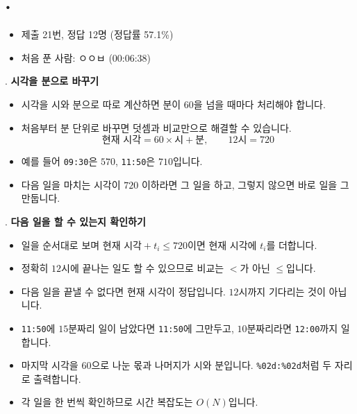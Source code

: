 
\section{\texorpdfstring{\pletter. \ptitle}{문제 \pletter}}

\begin{frame}[label=problem-C]
    \sectiontitle{\pletter}{\ptitle}
    \begin{itemize}
        \item 제출 21번, 정답 12명 (정답률 57.1\%)
        \item 처음 푼 사람: ㅇㅇㅂ (00:06:38)
    \end{itemize}
\end{frame}

\begin{frame}{\textbf{\pletter}. \ptitle}
    \textbf{시각을 분으로 바꾸기}
\begin{itemize}
        \item 시각을 시와 분으로 따로 계산하면 분이 $60$을 넘을 때마다 처리해야 합니다.
        \item 처음부터 분 단위로 바꾸면 덧셈과 비교만으로 해결할 수 있습니다.
        \[
            \text{현재 시각}=60\times\text{시}+\text{분},\qquad 12\text{시}=720
        \]
        \item 예를 들어 \texttt{09:30}은 $570$, \texttt{11:50}은 $710$입니다.
        \item 다음 일을 마치는 시각이 $720$ 이하라면 그 일을 하고, 그렇지 않으면 바로 일을 그만둡니다.
    \end{itemize}
\end{frame}

\begin{frame}{\textbf{\pletter}. \ptitle}
    \textbf{다음 일을 할 수 있는지 확인하기}
\begin{itemize}
        \item 일을 순서대로 보며 $\text{현재 시각}+t_i\le720$이면 현재 시각에 $t_i$를 더합니다.
        \item 정확히 $12$시에 끝나는 일도 할 수 있으므로 비교는 $<$가 아닌 $\le$입니다.
        \item 다음 일을 끝낼 수 없다면 현재 시각이 정답입니다. $12$시까지 기다리는 것이 아닙니다.
        \item \texttt{11:50}에 $15$분짜리 일이 남았다면 \texttt{11:50}에 그만두고, $10$분짜리라면 \texttt{12:00}까지 일합니다.
        \item 마지막 시각을 $60$으로 나눈 몫과 나머지가 시와 분입니다. \texttt{\%02d:\%02d}처럼 두 자리로 출력합니다.
        \item 각 일을 한 번씩 확인하므로 시간 복잡도는 $O(N)$입니다.
    \end{itemize}
\end{frame}
